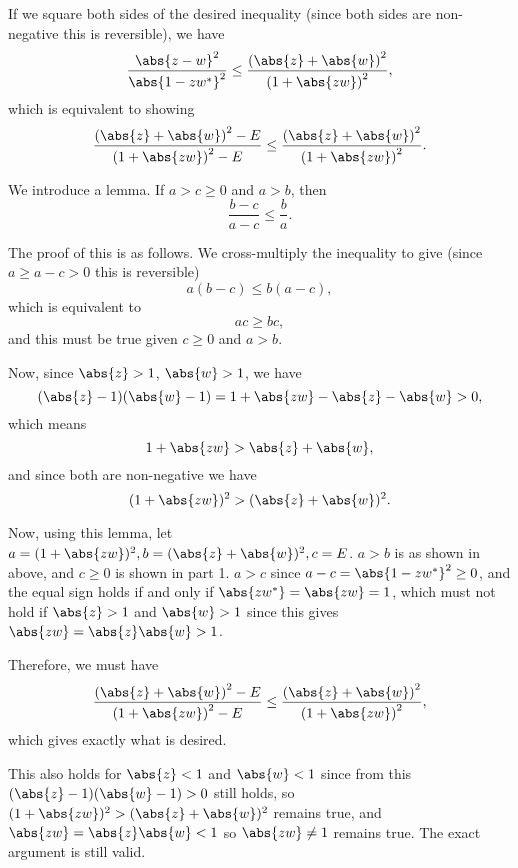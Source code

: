 If we square both sides of the desired inequality (since both sides are non-negative this is reversible), we have
\[
    \frac{\abs{z - w}^2}{\abs{1 - zw^*}^2} \leq \frac{\left(\abs{z} + \abs{w}\right)^2}{\left(1 + \abs{zw}\right)^2},
\]
which is equivalent to showing
\[
    \frac{\left(\abs{z} + \abs{w}\right)^2 - E}{\left(1 + \abs{zw}\right)^2 - E} \leq \frac{\left(\abs{z} + \abs{w}\right)^2}{\left(1 + \abs{zw}\right)^2}.
\]

We introduce a lemma. If \(a > c \geq 0\) and \(a > b\), then
\[
    \frac{b - c}{a - c} \leq \frac{b}{a}.
\]

The proof of this is as follows. We cross-multiply the inequality to give (since \(a \geq a - c > 0\) this is reversible)
\[
    a(b - c) \leq  b (a - c),
\]
which is equivalent to
\[
    ac \geq bc,
\]
and this must be true given \(c \geq 0\) and \(a > b\).

Now, since \(\abs{z} > 1\), \(\abs{w} > 1\), we have
\[
    (\abs{z} - 1)(\abs{w} - 1) = 1 + \abs{zw} - \abs{z} - \abs{w} > 0,
\]
which means
\[
    1 + \abs{zw} > \abs{z} + \abs{w},
\]
and since both are non-negative we have
\[
    (1 + \abs{zw})^2 > (\abs{z} + \abs{w})^2.
\]

Now, using this lemma, let \(a = (1 + \abs{zw})^2, b = (\abs{z} + \abs{w})^2, c = E\). \(a > b\) is as shown in above, and \(c \geq 0\) is shown in part 1. \(a > c\) since \(a - c = \abs{1 - zw^*}^2 \geq 0\), and the equal sign holds if and only if \(\abs{zw^*} = \abs{zw} = 1\), which must not hold if \(\abs{z} > 1\) and \(\abs{w} > 1\) since this gives \(\abs{zw} = \abs{z} \abs{w} > 1\).

Therefore, we must have
\[
    \frac{\left(\abs{z} + \abs{w}\right)^2 - E}{\left(1 + \abs{zw}\right)^2 - E} \leq \frac{\left(\abs{z} + \abs{w}\right)^2}{\left(1 + \abs{zw}\right)^2},
\]
which gives exactly what is desired.

This also holds for \(\abs{z} < 1\) and \(\abs{w} < 1\) since from this \((\abs{z} - 1)(\abs{w} - 1) > 0\) still holds, so \((1 + \abs{zw})^2 > (\abs{z} + \abs{w})^2\) remains true, and \(\abs{zw} = \abs{z}\abs{w} < 1\) so \(\abs{zw} \neq 1\) remains true. The exact argument is still valid.